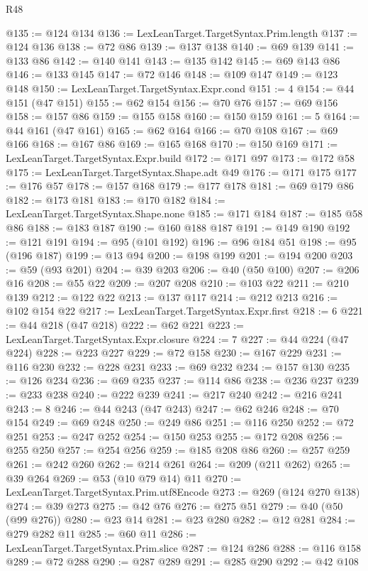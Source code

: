 \begin{lexlean}{R48}
\begin{coremodule}
@135 := @124 @134
@136 := LexLeanTarget.TargetSyntax.Prim.length
@137 := @124 @136
@138 := @72 @86
@139 := @137 @138
@140 := @69 @139
@141 := @133 @86
@142 := @140 @141
@143 := @135 @142
@145 := @69 @143 @86
@146 := @133 @145
@147 := @72 @146
@148 := @109 @147
@149 := @123 @148
@150 := LexLeanTarget.TargetSyntax.Expr.cond
@151 := 4
@154 := @44 @151 (@47 @151)
@155 := @62 @154
@156 := @70 @76
@157 := @69 @156
@158 := @157 @86
@159 := @155 @158
@160 := @150 @159
@161 := 5
@164 := @44 @161 (@47 @161)
@165 := @62 @164
@166 := @70 @108
@167 := @69 @166
@168 := @167 @86
@169 := @165 @168
@170 := @150 @169
@171 := LexLeanTarget.TargetSyntax.Expr.build
@172 := @171 @97
@173 := @172 @58
@175 := LexLeanTarget.TargetSyntax.Shape.adt @49
@176 := @171 @175
@177 := @176 @57
@178 := @157 @168
@179 := @177 @178
@181 := @69 @179 @86
@182 := @173 @181
@183 := @170 @182
@184 := LexLeanTarget.TargetSyntax.Shape.none
@185 := @171 @184
@187 := @185 @58 @86
@188 := @183 @187
@190 := @160 @188 @187
@191 := @149 @190
@192 := @121 @191
@194 := @95 (@101 @192)
@196 := @96 @184 @51
@198 := @95 (@196 @187)
@199 := @13 @94
@200 := @198 @199
@201 := @194 @200
@203 := @59 (@93 @201)
@204 := @39 @203
@206 := @40 (@50 @100)
@207 := @206 @16
@208 := @55 @22
@209 := @207 @208
@210 := @103 @22
@211 := @210 @139
@212 := @122 @22
@213 := @137 @117
@214 := @212 @213
@216 := @102 @154 @22
@217 := LexLeanTarget.TargetSyntax.Expr.first
@218 := 6
@221 := @44 @218 (@47 @218)
@222 := @62 @221
@223 := LexLeanTarget.TargetSyntax.Expr.closure
@224 := 7
@227 := @44 @224 (@47 @224)
@228 := @223 @227
@229 := @72 @158
@230 := @167 @229
@231 := @116 @230
@232 := @228 @231
@233 := @69 @232
@234 := @157 @130
@235 := @126 @234
@236 := @69 @235
@237 := @114 @86
@238 := @236 @237
@239 := @233 @238
@240 := @222 @239
@241 := @217 @240
@242 := @216 @241
@243 := 8
@246 := @44 @243 (@47 @243)
@247 := @62 @246
@248 := @70 @154
@249 := @69 @248
@250 := @249 @86
@251 := @116 @250
@252 := @72 @251
@253 := @247 @252
@254 := @150 @253
@255 := @172 @208
@256 := @255 @250
@257 := @254 @256
@259 := @185 @208 @86
@260 := @257 @259
@261 := @242 @260
@262 := @214 @261
@264 := @209 (@211 @262)
@265 := @39 @264
@269 := @53 (@10 @79 @14) @11
@270 := LexLeanTarget.TargetSyntax.Prim.utf8Encode
@273 := @269 (@124 @270 @138)
@274 := @39 @273
@275 := @42 @76
@276 := @275 @51
@279 := @40 (@50 (@99 @276))
@280 := @23 @14
@281 := @23 @280
@282 := @12 @281
@284 := @279 @282 @11
@285 := @60 @11
@286 := LexLeanTarget.TargetSyntax.Prim.slice
@287 := @124 @286
@288 := @116 @158
@289 := @72 @288
@290 := @287 @289
@291 := @285 @290
@292 := @42 @108

\end{coremodule}
\end{lexlean}
